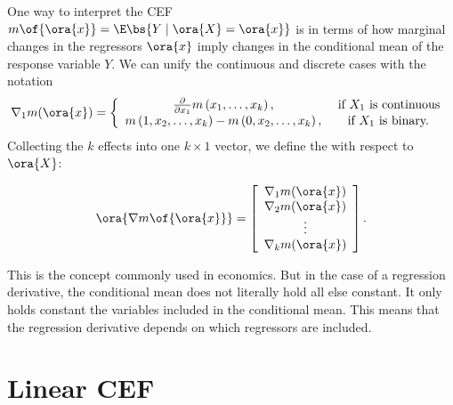One way to interpret the CEF $m\of{\ora{x}} = \E\bs{Y \mid \ora{X} = \ora{x}}$ is in terms of how marginal changes in the regressors $\ora{x}$ imply changes in the conditional mean of the response variable $Y$. We can unify the continuous and discrete cases with the notation
\begin{equation}
    \notag
    \nabla_1 m(\ora{x})=\left\{\begin{array}{cc}
        \frac{\partial}{\partial x_1} m\left(x_1, \ldots, x_k\right), & \text { if } X_1 \text { is continuous } \\
        m\left(1, x_2, \ldots, x_k\right)-m\left(0, x_2, \ldots, x_k\right), & \text { if } X_1 \text { is binary. }
        \end{array}\right.
\end{equation}
Collecting the $k$ effects into one $k \times 1$ vector, we define the  with respect to $\ora{X}$:

\begin{equation}
    \notag
    \ora{\nabla m\of{\ora{x}}} = \left[\begin{array}{cccc}
        \nabla_1 m(\ora{x}) \\
        \nabla_2 m(\ora{x}) \\
        \vdots \\
        \nabla_k m(\ora{x})
    \end{array} \right] .
\end{equation}

 This is the  concept commonly used in economics. But in the case of a regression derivative, the conditional mean does not literally hold all else constant. It only holds constant the variables included in the conditional mean. This means that the regression derivative depends on which regressors are included. 

\section{Linear CEF}


